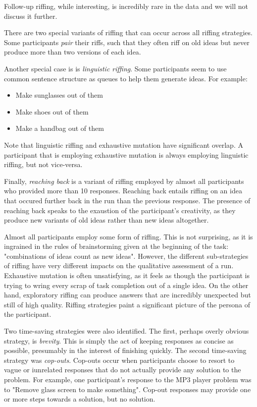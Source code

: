 Follow-up riffing, while interesting, is incredibly rare in the data and we will not discuss it further.

There are two special variants of riffing that can occur across all riffing strategies. Some participants \emph{pair} their riffs, such that they often riff on old ideas but never produce more than two versions of each idea.

Another special case is is \emph{linguistic riffing}. Some participants seem to use common sentence structure as queues to help them generate ideas. For example:

\begin{itemize}
    \item Make sunglasses out of them
    \item Make shoes out of them
    \item Make a handbag out of them
\end{itemize}

Note that linguistic riffing and exhaustive mutation have significant overlap. A participant that is employing exhaustive mutation is always employing linguistic riffing, but not vice-versa.

Finally, \emph{reaching back} is a variant of riffing employed by almost all participants who provided more than 10 responses. Reaching back entails riffing on an idea that occured further back in the run than the previous response. The presence of reaching back speaks to the exaustion of the participant's creativity, as they produce new variants of old ideas rather than new ideas altogether.

Almost all participants employ some form of riffing. This is not surprising, as it is ingrained in the rules of brainstorming given at the beginning of the task: "combinations of ideas count as new ideas". However, the different sub-strategies of riffing have very different impacts on the qualitative assessment of a run. Exhaustive mutation is often unsatisfying, as it feels as though the participant is trying to wring every scrap of task completion out of a single idea. On the other hand, exploratory riffing can produce answers that are incredibly unexpected but still of high quality. Riffing strategies paint a significant picture of the persona of the participant.

Two time-saving strategies were also identified. The first, perhaps overly obvious strategy, is \emph{brevity}. This is simply the act of keeping responses as concise as possible, presumably in the interest of finishing quickly. The second time-saving strategy was \emph{cop-outs}. Cop-outs occur when participants choose to resort to vague or iunrelated responses that do not actually provide any solution to the problem. For example, one participant's response to the MP3 player problem was to "Remove glass screen to make something". Cop-out responses may provide one or more steps towards a solution, but no solution.

